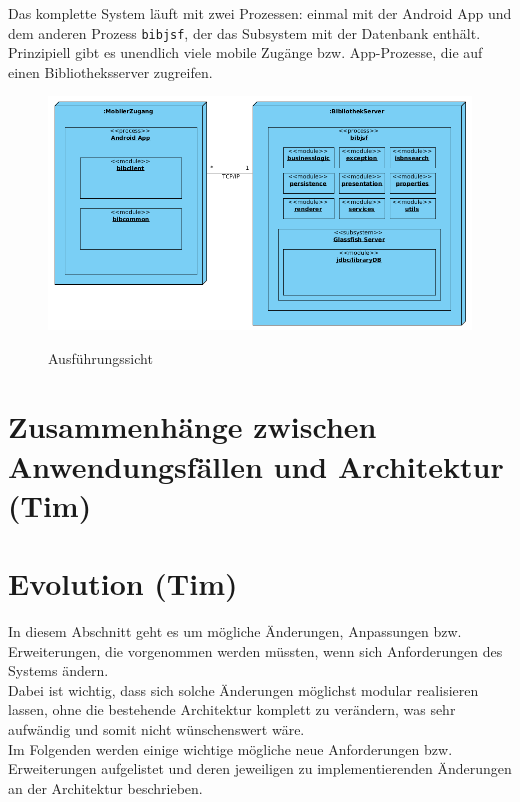 \documentclass[fontsize=12pt,paper=a4,twoside]{scrartcl}
\begin{document}
Das komplette System läuft mit zwei Prozessen: einmal mit der Android App und dem anderen Prozess \texttt{bibjsf}, der das Subsystem mit der Datenbank enthält. Prinzipiell gibt es unendlich viele mobile Zugänge bzw. App-Prozesse, die auf einen Bibliotheksserver zugreifen.

\begin{figure} [H] 
\caption{Ausführungssicht} 
	\includegraphics[width=1\textwidth]{Diagramme/ausfuehrungssicht.png} 
	\label{ausfuehrungssicht} 
\end{figure}
\label{sec:ausfuehrung}

\section{Zusammenhänge zwischen Anwendungsfällen und Architektur (Tim)}
\label{sec:anwendungsfaelle}



\section{Evolution (Tim)}


\label{sec:evolution}

In diesem Abschnitt geht es um mögliche Änderungen, Anpassungen bzw. Erweiterungen, die vorgenommen werden müssten, wenn sich Anforderungen des Systems ändern. \\
Dabei ist wichtig, dass sich solche Änderungen möglichst modular realisieren lassen, ohne die bestehende Architektur komplett zu verändern, was sehr aufwändig und somit nicht wünschenswert wäre. \\
Im Folgenden werden einige wichtige mögliche neue Anforderungen bzw. Erweiterungen aufgelistet und deren jeweiligen zu implementierenden Änderungen an der Architektur beschrieben. 
\end{document}
